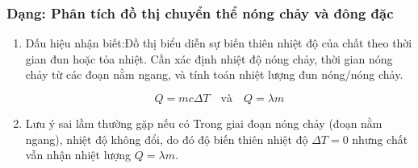 \subsubsection{Dạng: Phân tích đồ thị chuyển thể nóng chảy và đông đặc}


\begin{phuongphap}
	\begin{enumerate}
		\item Dấu hiệu nhận biết:Đồ thị biểu diễn sự biến thiên nhiệt độ của chất theo thời gian đun hoặc tỏa nhiệt. Cần xác định nhiệt độ nóng chảy, thời gian nóng chảy từ các đoạn nằm ngang, và tính toán nhiệt lượng đun nóng/nóng chảy.
	
			\begin{equation}
				Q = m c \Delta T \quad \text{và} \quad Q = \lambda m
				\label{eq:heat_graph}
		\end{equation}
		\item Lưu ý sai lầm thường gặp nếu có Trong giai đoạn nóng chảy (đoạn nằm ngang), nhiệt độ không đổi, do đó độ biến thiên nhiệt độ $\Delta T = 0$ nhưng chất vẫn nhận nhiệt lượng $Q = \lambda m$.
	\end{enumerate}
\end{phuongphap}

